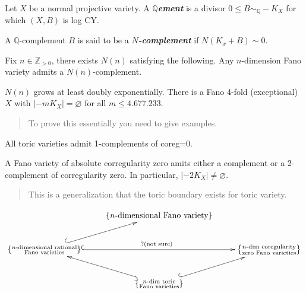 \begin{definition}
\label{definition-moraga-16}
Let $X$ be a normal projective variety. A
\textit{\textbf{$\mathbb{Q}$ement}} is a
divisor $0\leq B \sim_{\mathbb{Q}}-K_{X}  $
for which $(X,B)$ is log CY.

A $\mathbb{Q}$-complement $B$ is said to be a
\textit{\textbf{$N$-complement}} if
$N(K_{x}+B)\sim 0$.
\end{definition}

\begin{theorem}
\label{theorem-moraga-21}
Fix $n \in \mathbb{Z}_{>0}$, there exists
$N(n)$ satisfying the following. Any
$n$-dimension Fano variety admits a
$N(n)$-complement.
\end{theorem}

\begin{theorem}[Totaro, 22]
\label{theorem-moraga-22}
$N(n)$ grows at least doubly exponentially.
There is a Fano 4-fold (exceptional) $X$ with
$|-mK_{X}|=\varnothing $ for all $m\leq
4.677.233$.
\end{theorem}

\begin{quotation}
To prove this essentially you need to give
examples.
\end{quotation}

\begin{remark}
\label{remark-moraga-8}
All toric varieties admit 1-complements of
coreg=0.
\end{remark}

\begin{theorem}
\label{theorem-moraga-23}
A Fano variety of absolute corregularity zero
amits either a complement or a 2-complement
of corregularity zero. In particular,
$|-2K_{X}| \neq \varnothing $.
\end{theorem}

\begin{quotation}
This is a generalization that the toric
boundary exists for toric variety.
\end{quotation}

$$
\xymatrix{&\{n\text{-dimensional Fano
variety}\}&\\ \left\{
\substack{n\text{-dimensional rational}\\
\text{Fano varieties}}
\right\}\ar@{^{(}->}[ur]\ar@{^{(}->}[rr]^{?
\text{(not
sure)}}&&\left\{ \substack{n\text{-dim
coregularity}\\ \text{zero Fano varieties}}
\right\}\\ &\left\{ \substack{n\text{-dim
toric}\\ \text{Fano varieties}}
\right\}\ar@{^{(}->}[ul]\ar@{^{(}->}[ur]&}
$$


